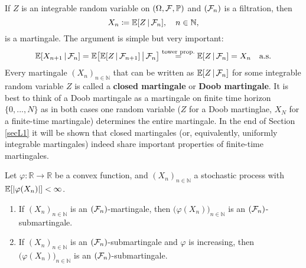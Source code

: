 \begin{example}\label{doobmartingale}
			If $Z$ is an integrable random variable on $(\Omega,\mathcal{F},\mathbb{P})$ and $(\mathcal{F}_n)$ is a filtration, then $$X_n \coloneqq \mathbb{E}[Z\,|\,\mathcal{F}_n],\quad n\in\mathbb{N},$$ is a martingale. The argument is simple but very important:
			\begin{align*}
				\mathbb{E}[X_{n+1}\,|\,\mathcal{F}_{n}] = \mathbb{E} \big[ \mathbb{E}[Z\,|\,\mathcal{F}_{n+1}]\,\big|\,\mathcal{F}_n \big] 
											\overset{\text{tower prop.}}{=} \mathbb{E}[Z\,|\,\mathcal{F}_n] = X_n\quad \text{a.s.}
			\end{align*}
			Every martingale $(X_n)_{n\in\mathbb{N}}$ that can be written as $\mathbb{E}[Z\,|\,\mathcal{F}_n]$ for some integrable random variable $Z$ is called a \textbf{closed martingale} or \textbf{Doob martingale}. It is best to think of a Doob martingale as a martingale on finite time horizon $\{0,...,N\}$ as in both cases one random variable ($Z$ for a Doob martinglae, $X_N$ for a finite-time martingale) determines the entire martingale. In the end of Section \ref{secL1} it will be shown that closed martingales (or, equivalently, uniformly integrable martingales) indeed share important properties of finite-time martingales.
%			
%			

	\end{example}
\begin{llemma}
\begin{prop}\label{prop314}
	Let $\varphi \colon \mathbb{R} \rightarrow \mathbb{R}$ be a convex function, and $(X_n)_{n\in\mathbb{N}}$ a stochastic process with $\mathbb{E}[\left| \varphi(X_n)\right|] < \infty$.
	\begin{enumerate}[label=(\roman*)]
		\item
			If $(X_n)_{n\in\mathbb{N}}$ is an $(\mathcal{F}_n)$-martingale, then $\big(\varphi(X_n)\big)_{n\in\mathbb{N}}$ is an $(\mathcal{F}_n)$-submartingale.
			
		\item
			If $(X_n)_{n\in\mathbb{N}}$ is an $(\mathcal{F}_n)$-submartingale and $\varphi$ is increasing, then $\big(\varphi(X_n)\big)_{n\in\mathbb{N}}$ is an $(\mathcal{F}_n)$-submartingale.
	\end{enumerate}
\end{prop}
\end{llemma}
